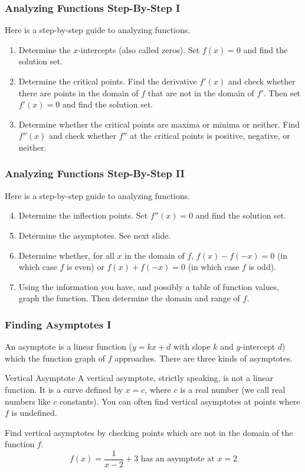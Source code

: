 \documentclass[xcolor=dvipsnames]{beamer}
\begin{document}
\begin{frame}
  \frametitle{Analyzing Functions Step-By-Step I}
Here is a step-by-step guide to analyzing functions.
\begin{enumerate}
\item Determine the $x$-intercepts (also called zeros). Set $f(x)=0$
  and find the solution set.
\item Determine the critical points. Find the derivative $f'(x)$ and
  check whether there are points in the domain of $f$ that are not in
  the domain of $f'$. Then set $f'(x)=0$ and find the solution set.
\item Determine whether the critical points are maxima or minima or
  neither. Find $f''(x)$ and check whether $f''$ at the critical
  points is positive, negative, or neither. 
\end{enumerate}
\end{frame}

\begin{frame}
  \frametitle{Analyzing Functions Step-By-Step II}
Here is a step-by-step guide to analyzing functions.
\begin{enumerate}
\setcounter{enumi}{3}
\item Determine the inflection points. Set $f''(x)=0$ and find the
  solution set.
\item Determine the asymptotes. See next slide.
\item Determine whether, for all $x$ in the domain of $f$,
  $f(x)-f(-x)=0$ (in which case $f$ is even) or $f(x)+f(-x)=0$ (in
  which case $f$ is odd).
\item Using the information you have, and possibly a table of function
  values, graph the function. Then determine the domain and range of
  $f$.
\end{enumerate}
\end{frame}

\begin{frame}
  \frametitle{Finding Asymptotes I}
An asymptote is a linear function ($y=kx+d$ with slope $k$ and
$y$-intercept $d$) which the function graph of $f$ approaches. There
are three kinds of asymptotes.
\begin{block}{Vertical Asymptote}
  A vertical asymptote, strictly speaking, is not a linear function.
  It is a curve defined by $x=c$, where $c$ is a real number (we call
  real numbers like $c$ \alert{constants}). You can often find
  vertical asymptotes at points where $f$ is undefined.
\end{block}
Find vertical asymptotes by checking points which are not in the
domain of the function $f$. 
\begin{equation}
  \label{eq:peimoojo}
f(x)=\frac{1}{x-2}+3\mbox{ has an asymptote at }x=2
\end{equation}
\end{frame}
\end{document}
